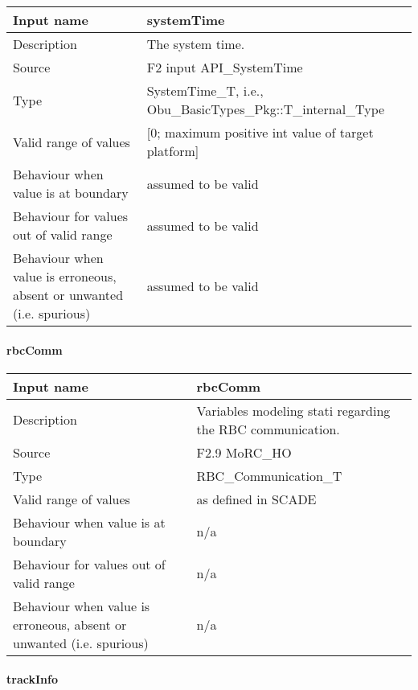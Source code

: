 \begin{longtable}{p{}p{}}
\toprule
Input name				& systemTime \\
\midrule
Description				& The system time. \\
\midrule
Source					& F2 input API\_SystemTime \\ 
\midrule
Type					& SystemTime\_T, i.e., Obu\_BasicTypes\_Pkg::T\_internal\_Type \\
\midrule
Valid range of values	& [0; maximum positive int value of target platform] \\
\midrule
Behaviour when value is at boundary	& assumed to be valid \\
\midrule
Behaviour for values out of valid range	& assumed to be valid \\
\midrule
Behaviour when value is erroneous, absent or unwanted (i.e. spurious) & assumed to be valid \\
\bottomrule
\end{longtable}

\paragraph{rbcComm}

\begin{longtable}{p{}p{}}
\toprule
Input name				& rbcComm \\
\midrule
Description				& Variables modeling stati regarding the RBC communication. \\
\midrule
Source					& F2.9 MoRC\_HO \\ 
\midrule
Type					& RBC\_Communication\_T \\
\midrule
Valid range of values	& as defined in SCADE \\
\midrule
Behaviour when value is at boundary	& n/a \\
\midrule
Behaviour for values out of valid range	& n/a \\
\midrule
Behaviour when value is erroneous, absent or unwanted (i.e. spurious) & n/a \\
\bottomrule
\end{longtable}

\paragraph{trackInfo}

